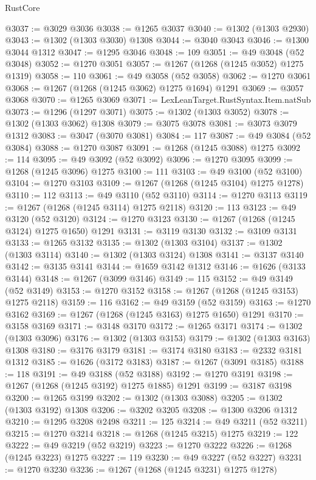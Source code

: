 \begin{lexlean}{RustCore}
\begin{coremodule}
@3037 := @3029 @3036
@3038 := @1265 @3037
@3040 := @1302 (@1303 @2930)
@3043 := @1302 (@1303 @3030) @1308
@3044 := @3040 @3043
@3046 := @1300 @3044 @1312
@3047 := @1295 @3046
@3048 := 109
@3051 := @49 @3048 (@52 @3048)
@3052 := @1270 @3051
@3057 := @1267 (@1268 (@1245 @3052) @1275 @1319)
@3058 := 110
@3061 := @49 @3058 (@52 @3058)
@3062 := @1270 @3061
@3068 := @1267 (@1268 (@1245 @3062) @1275 @1694) @1291
@3069 := @3057 @3068
@3070 := @1265 @3069
@3071 := LexLeanTarget.RustSyntax.Item.natSub
@3073 := @1296 (@1297 @3071)
@3075 := @1302 (@1303 @3052)
@3078 := @1302 (@1303 @3062) @1308
@3079 := @3075 @3078
@3081 := @3073 @3079 @1312
@3083 := @3047 (@3070 @3081)
@3084 := 117
@3087 := @49 @3084 (@52 @3084)
@3088 := @1270 @3087
@3091 := @1268 (@1245 @3088) @1275
@3092 := 114
@3095 := @49 @3092 (@52 @3092)
@3096 := @1270 @3095
@3099 := @1268 (@1245 @3096) @1275
@3100 := 111
@3103 := @49 @3100 (@52 @3100)
@3104 := @1270 @3103
@3109 := @1267 (@1268 (@1245 @3104) @1275 @1278)
@3110 := 112
@3113 := @49 @3110 (@52 @3110)
@3114 := @1270 @3113
@3119 := @1267 (@1268 (@1245 @3114) @1275 @2118)
@3120 := 113
@3123 := @49 @3120 (@52 @3120)
@3124 := @1270 @3123
@3130 := @1267 (@1268 (@1245 @3124) @1275 @1650) @1291
@3131 := @3119 @3130
@3132 := @3109 @3131
@3133 := @1265 @3132
@3135 := @1302 (@1303 @3104)
@3137 := @1302 (@1303 @3114)
@3140 := @1302 (@1303 @3124) @1308
@3141 := @3137 @3140
@3142 := @3135 @3141
@3144 := @1659 @3142 @1312
@3146 := @1626 (@3133 @3144)
@3148 := @1267 (@3099 @3146)
@3149 := 115
@3152 := @49 @3149 (@52 @3149)
@3153 := @1270 @3152
@3158 := @1267 (@1268 (@1245 @3153) @1275 @2118)
@3159 := 116
@3162 := @49 @3159 (@52 @3159)
@3163 := @1270 @3162
@3169 := @1267 (@1268 (@1245 @3163) @1275 @1650) @1291
@3170 := @3158 @3169
@3171 := @3148 @3170
@3172 := @1265 @3171
@3174 := @1302 (@1303 @3096)
@3176 := @1302 (@1303 @3153)
@3179 := @1302 (@1303 @3163) @1308
@3180 := @3176 @3179
@3181 := @3174 @3180
@3183 := @2332 @3181 @1312
@3185 := @1626 (@3172 @3183)
@3187 := @1267 (@3091 @3185)
@3188 := 118
@3191 := @49 @3188 (@52 @3188)
@3192 := @1270 @3191
@3198 := @1267 (@1268 (@1245 @3192) @1275 @1885) @1291
@3199 := @3187 @3198
@3200 := @1265 @3199
@3202 := @1302 (@1303 @3088)
@3205 := @1302 (@1303 @3192) @1308
@3206 := @3202 @3205
@3208 := @1300 @3206 @1312
@3210 := @1295 @3208 @2498
@3211 := 125
@3214 := @49 @3211 (@52 @3211)
@3215 := @1270 @3214
@3218 := @1268 (@1245 @3215) @1275
@3219 := 122
@3222 := @49 @3219 (@52 @3219)
@3223 := @1270 @3222
@3226 := @1268 (@1245 @3223) @1275
@3227 := 119
@3230 := @49 @3227 (@52 @3227)
@3231 := @1270 @3230
@3236 := @1267 (@1268 (@1245 @3231) @1275 @1278)

\end{coremodule}
\end{lexlean}
